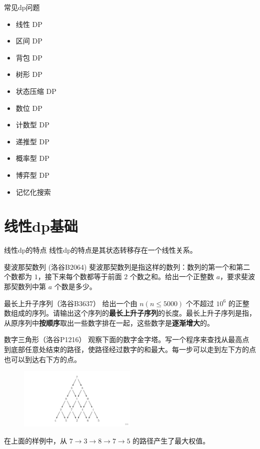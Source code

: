 \documentclass{beamer}
\begin{document}
\begin{frame}{常见dp问题}
    \begin{itemize}
        \item 线性 DP
        \item 区间 DP
        \item 背包 DP
        \item 树形 DP
        \item 状态压缩 DP
        \item 数位 DP
        \item 计数型 DP
        \item 递推型 DP
        \item 概率型 DP
        \item 博弈型 DP
        \item 记忆化搜索
    \end{itemize}
\end{frame}

\section{线性dp基础}

\begin{frame}{线性dp的特点}
    线性dp的特点是其状态转移存在一个线性关系。
\end{frame}

\begin{frame}{斐波那契数列 (洛谷B2064)}
    斐波那契数列是指这样的数列：数列的第一个和第二个数都为 $1$，接下来每个数都等于前面 $2$ 个数之和。给出一个正整数 $a$，要求斐波那契数列中第 $a$ 个数是多少。
\end{frame}

\begin{frame}{最长上升子序列（洛谷B3637）}
    给出一个由 $n(n\le 5000)$ 个不超过 $10^6$ 的正整数组成的序列。请输出这个序列的\textbf{最长上升子序列}的长度。最长上升子序列是指，从原序列中\textbf{按顺序}取出一些数字排在一起，这些数字是\textbf{逐渐增大}的。
\end{frame}

\begin{frame}{数字三角形（洛谷P1216）}
    观察下面的数字金字塔。写一个程序来查找从最高点到底部任意处结束的路径，使路径经过数字的和最大。每一步可以走到左下方的点也可以到达右下方的点。
    \begin{figure}
        \centering
        \includegraphics[width=0.5\textwidth]{./ex.png}
    \end{figure}
    在上面的样例中，从 $7 \rightarrow 3 \rightarrow 8 \rightarrow 7 \rightarrow 5$ 的路径产生了最大权值。
\end{frame}
\end{document}
